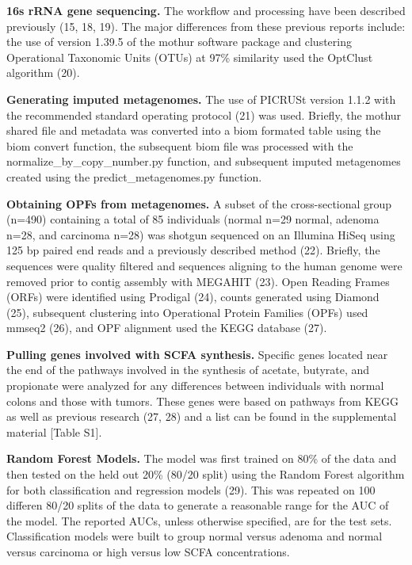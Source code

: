 \documentclass[11pt,]{article}
\begin{document}
\textbf{16s rRNA gene sequencing.} The workflow and processing have been
described previously (15, 18, 19). The major differences from these
previous reports include: the use of version 1.39.5 of the mothur
software package and clustering Operational Taxonomic Units (OTUs) at
97\% similarity used the OptClust algorithm (20).

\textbf{Generating imputed metagenomes.} The use of PICRUSt version
1.1.2 with the recommended standard operating protocol (21) was used.
Briefly, the mothur shared file and metadata was converted into a biom
formated table using the biom convert function, the subsequent biom file
was processed with the normalize\_by\_copy\_number.py function, and
subsequent imputed metagenomes created using the predict\_metagenomes.py
function.

\textbf{Obtaining OPFs from metagenomes.} A subset of the
cross-sectional group (n=490) containing a total of 85 individuals
(normal n=29 normal, adenoma n=28, and carcinoma n=28) was shotgun
sequenced on an Illumina HiSeq using 125 bp paired end reads and a
previously described method (22). Briefly, the sequences were quality
filtered and sequences aligning to the human genome were removed prior
to contig assembly with MEGAHIT (23). Open Reading Frames (ORFs) were
identified using Prodigal (24), counts generated using Diamond (25),
subsequent clustering into Operational Protein Families (OPFs) used
mmseq2 (26), and OPF alignment used the KEGG database (27).

\textbf{Pulling genes involved with SCFA synthesis.} Specific genes
located near the end of the pathways involved in the synthesis of
acetate, butyrate, and propionate were analyzed for any differences
between individuals with normal colons and those with tumors. These
genes were based on pathways from KEGG as well as previous research (27,
28) and a list can be found in the supplemental material {[}Table S1{]}.

\textbf{Random Forest Models.} The model was first trained on 80\% of
the data and then tested on the held out 20\% (80/20 split) using the
Random Forest algorithm for both classification and regression models
(29). This was repeated on 100 differen 80/20 splits of the data to
generate a reasonable range for the AUC of the model. The reported AUCs,
unless otherwise specified, are for the test sets. Classification models
were built to group normal versus adenoma and normal versus carcinoma or
high versus low SCFA concentrations.
\end{document}
